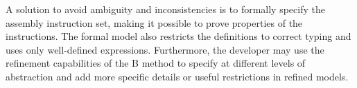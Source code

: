 \documentclass[a4paper]{llncs}
\begin{document}
A solution to avoid ambiguity and inconsistencies is to formally
specify the assembly instruction set, making it possible to prove
properties of the instructions. The formal model also restricts the
definitions to correct typing and uses only well-defined
expressions. Furthermore, the developer may use the refinement
capabilities of the B method to specify at different levels of
abstraction and add more specific details or useful restrictions in
refined models.

%
%
%
\end{document}
